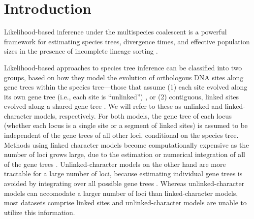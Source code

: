 \section{Introduction}




Likelihood-based inference under the multispecies coalescent is a powerful 
framework for estimating species trees,  divergence times, and  effective 
population sizes in the presence of incomplete lineage sorting 
\citep{xuChallengesSpeciesTree2016}.

Likelihood-based approaches to species 
tree inference can be classified into two groups, based on how they model the 
evolution of orthologous DNA sites along gene trees within the species 
tree---those that assume (1) each site evolved along its own gene tree 
(i.e., each site is ``unlinked'') 
\citep{bryantInferringSpeciesTrees2012, maioPoMoAlleleFrequencyBased2015}, 
or (2) contiguous, linked sites evolved along a shared gene tree 
\citep{liuSpeciesTreesGene2007, ogilvieStarBEAST2BringsFaster2017, 
yangBPPProgramSpecies2015}. We will refer to these as unlinked and 
linked-character models, respectively. For both models, the gene tree of each 
locus (whether each locus is a single site or a segment of linked sites) 
is assumed to be independent of the gene 
trees of all other loci, conditional on the species tree.
Methods using linked character models become computationally expensive as the
number of loci grows large, due to the estimation or numerical integration of
all of the gene trees \citep{bryantInferringSpeciesTrees2012}.
Unlinked-character models on the other 
hand are more tractable for a large number of loci, because  estimating 
individual gene trees is avoided by integrating over all possible gene trees 
\citep{bryantInferringSpeciesTrees2012}.
Whereas unlinked-character models can accomodate a larger number of loci than
linked-character models, most datasets comprise linked sites and
unlinked-character models are unable to utilize this information.

